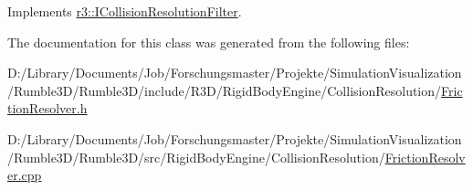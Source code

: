 Implements \mbox{\hyperlink{classr3_1_1_i_collision_resolution_filter_a87ef2579e2acaaadef4cd8f9a20005ce}{r3\+::\+I\+Collision\+Resolution\+Filter}}.



The documentation for this class was generated from the following files\+:\begin{DoxyCompactItemize}
\item 
D\+:/\+Library/\+Documents/\+Job/\+Forschungsmaster/\+Projekte/\+Simulation\+Visualization/\+Rumble3\+D/\+Rumble3\+D/include/\+R3\+D/\+Rigid\+Body\+Engine/\+Collision\+Resolution/\mbox{\hyperlink{_friction_resolver_8h}{Friction\+Resolver.\+h}}\item 
D\+:/\+Library/\+Documents/\+Job/\+Forschungsmaster/\+Projekte/\+Simulation\+Visualization/\+Rumble3\+D/\+Rumble3\+D/src/\+Rigid\+Body\+Engine/\+Collision\+Resolution/\mbox{\hyperlink{_friction_resolver_8cpp}{Friction\+Resolver.\+cpp}}\end{DoxyCompactItemize}
